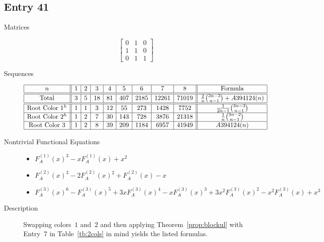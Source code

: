 \documentclass[12pt]{amsart}
\newcommand{\gff}[2]{F_{#2}^{(#1)}(x)}
\newcommand{\gfa}[1]{\gff{#1}{A}}
\begin{document}
\subsection*{Entry 41}
\begin{description}
    \item[Matrices]
    
    \[\begin{bmatrix}
0 & 1 & 0 \\
1 & 1 & 0 \\
0 & 1 & 1
\end{bmatrix}\]
    \item[Sequences]\hspace*{\fill}\vspace{-0.5cm}
    \begin{center}
        \[
        \begin{array}{|c||c|c|c|c|c|c|c|c||c|}\hline
           n  & 1 & 2 & 3 & 4 & 5 & 6 & 7 & 8  & \text{Formula}\\\hline\hline
           \text{Total}  & 3 & 5 & 18 & 81 & 407 & 2185 & 12261 & 71019 & \frac{2}{n}\binom{3n-3}{n-1}+A394124(n)\\\hline\hline
           \text{Root Color }1^{h} & 1 & 1 & 3 & 12 & 55 & 273 & 1428 & 7752 & \frac{1}{2n-1}\binom{3n-3}{n-1}\\\hline
           \text{Root Color }2^{h} & 1 & 2 & 7 & 30 & 143 & 728 & 3876 & 21318 & \frac{1}{n}\binom{3n-2}{n-1}\\\hline
           \text{Root Color }3 & 1 & 2 & 8 & 39 & 209 & 1184 & 6957 & 41949 & A394124(n) \\\hline
        \end{array}
        \]
    \end{center}
    
    \item[Nontrivial Functional Equations]\hspace*{\fill}

    \begin{itemize}
\item $\gfa{1}^3-x\gfa{1}+x^2$


\item $\gfa{2}^3-2\gfa{2}^2+\gfa{2}-x$

\item $\gfa{3}^6-\gfa{3}^5+3x\gfa{3}^4-x\gfa{3}^3+3x^2\gfa{3}^2-x^2\gfa{3}+x^3$


\end{itemize}

\item[Description] Swapping colors~$1$ and~$2$ and then applying Theorem~\ref{prop:blockul} with Entry~7 in Table~\ref{tb:2cols} 
in mind yields the listed formulas.
    
\end{description}
\end{document}

